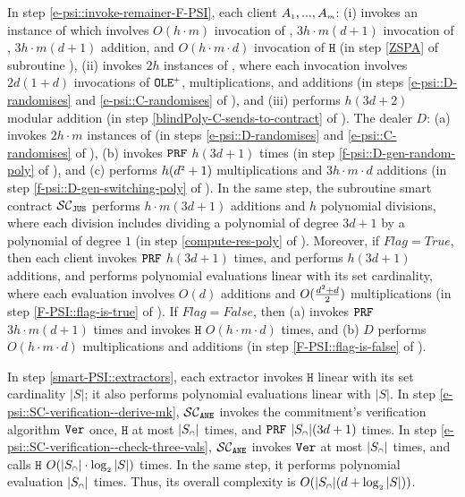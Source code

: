 In step \ref{e-psi::invoke-remainer-F-PSI}, each client   $A_{\scriptscriptstyle  1},...,    A_{\scriptscriptstyle   m}$: (i) invokes an instance of \zspaa which involves $O(h\cdot m)$ invocation of \ct, $3h\cdot m (d+1)$ invocation of \prf, $3h\cdot m (d+1)$ addition, and $O(h\cdot m\cdot d)$ invocation of $\mathtt{H}$ (in step \ref{ZSPA} of subroutine \fpsi), (ii) invokes $2h$ instances of \vopr, where each \vopr invocation involves $2d(1+d)$ invocations of $\mathtt{OLE}^{\scriptscriptstyle +}$, multiplications, and additions  (in steps \ref{e-psi::D-randomises} and \ref{e-psi::C-randomises} of \fpsi), and (iii) performs $h(3d+2)$ modular addition (in step \ref{blindPoly-C-sends-to-contract} of  \fpsi).  
The dealer $D$:  (a) invokes $2h\cdot m$ instances of \vopr  (in steps \ref{e-psi::D-randomises} and \ref{e-psi::C-randomises} of \fpsi), (b) invokes $\mathtt{PRF}$ $h(3d+1)$ times (in step \ref{f-psi::D-gen-random-poly} of \fpsi), and (c) performs $h(d^{\scriptscriptstyle 2}+1)$ multiplications and $3h\cdot m\cdot d$ additions (in step \ref{f-psi::D-gen-switching-poly} of \fpsi). 
% 
In the same step, the subroutine smart contract $\mathcal{SC}_{\mathtt{JUS}}$ performs $h\cdot m(3d+1)$ additions and $h$ polynomial divisions,  where each division includes dividing a polynomial of degree $3d+1$ by a polynomial of degree $1$ (in step \ref{compute-res-poly} of \fpsi). 
%
Moreover, if $Flag=True$, then each client invokes $\mathtt{PRF}$ $h (3d+1)$ times, and performs $h (3d+1)$ additions, and performs polynomial evaluations linear with its set cardinality, where each evaluation involves  $O(d)$  additions and $O(\frac{d^{\scriptscriptstyle 2}+d}{2})$ multiplications (in step \ref{F-PSI::flag-is-true} of \fpsi). If $Flag=False$, then (a) \aud invokes $\mathtt{PRF}$ $3h\cdot m(d+1)$ times  and  invokes $\mathtt{H}$ $O(h\cdot m\cdot d)$ times, and (b) $D$ performs $O(h\cdot m\cdot d)$ multiplications and additions (in step \ref{F-PSI::flag-is-false} of \fpsi). 




In step \ref{smart-PSI::extractors}, each extractor invokes $\mathtt{H}$ linear with its set cardinality $|S|$; it also performs polynomial evaluations linear with $|S|$. 
%
In step \ref{e-psi::SC-verification--derive-mk}, $\mathcal{SC}_{\mathtt{ANE}}$ invokes the commitment's verification algorithm $\mathtt{Ver}$ once,  $\mathtt{H}$ at most $|S_{\scriptscriptstyle \cap}|$ times, and $\mathtt{PRF}$ $|S_{\scriptscriptstyle \cap}| (3d+1)$ times. In step \ref{e-psi::SC-verification--check-three-vals}, $\mathcal{SC}_{\mathtt{ANE}}$ invokes  $\mathtt{Ver}$ at most $|S_{\scriptscriptstyle \cap}|$ times, and calls $\mathtt{H}$ $O(|S_{\scriptscriptstyle \cap}|\cdot \log_{\scriptscriptstyle 2} |S|)$ times. In the same step, it  performs polynomial evaluation $|S_{\scriptscriptstyle \cap}|$ times. Thus, its overall complexity is $O( |S_{\scriptscriptstyle \cap}|(d+ \log_{\scriptscriptstyle 2} |S|))$.
  
